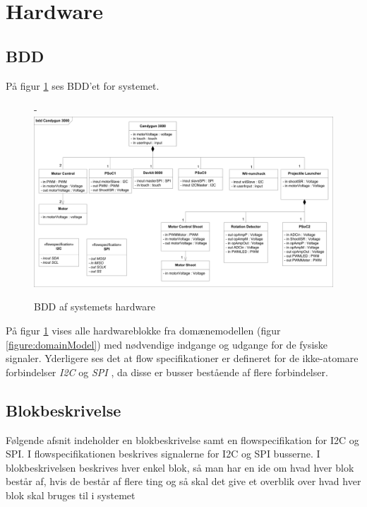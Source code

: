 \section{Hardware}

\subsection{BDD}
\label{afsnit:BDD}
På figur \ref{figure:bddDiagram} ses BDD'et for systemet.

\begin{figure}[H]
	\begin{adjustwidth}{-3cm}{-\rightmargin}
	\centering
	\includegraphics[width=0.85\paperwidth]{SystemArkitektur/images/BDD_overordnet1}
	\caption{BDD af systemets hardware}
	\label{figure:bddDiagram}
	\end{adjustwidth}
\end{figure}

\noindent På figur \ref{figure:bddDiagram} vises alle hardwareblokke fra domænemodellen (figur \ref{figure:domainModel}) med nødvendige indgange og udgange for de fysiske signaler. Yderligere ses det at flow specifikationer er defineret for de ikke-atomare forbindelser \textit{I2C}\cite{i2cbus} \cite{I2C} og \textit{SPI} \cite{spibus}, da disse er busser bestående af flere forbindelser.

\subsection{Blokbeskrivelse}
Følgende afsnit indeholder en blokbeskrivelse samt en flowspecifikation for I2C og SPI. I flowspecifikationen beskrives signalerne for I2C og SPI busserne.  I blokbeskrivelsen beskrives hver enkel blok, så man har en ide om hvad hver blok består af, hvis de består af flere ting og så skal det give et overblik over hvad hver blok skal bruges til i systemet \newline \newline

